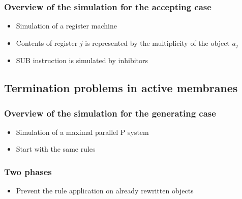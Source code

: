     \begin{frame}[t]\frametitle{Overview of the simulation for the accepting case}
      \begin{itemize}
        \item Simulation of a register machine
        \item Contents of register $j$ is represented by the multiplicity of the object $a_j$
        \item SUB instruction is simulated by inhibitors
      \end{itemize}
    \end{frame}
    \note{}


  \subsection{Termination problems in active membranes} %
  \label{sub:termination_problems_in_active_membranes}

    \begin{frame}[t]\frametitle{Overview of the simulation for the generating case}
      \begin{itemize}
        \item Simulation of a maximal parallel P system
        \item Start with the same rules
      \end{itemize}
      \simulationpicture
    \end{frame}
    \note{}

    \begin{frame}[t]\frametitle{Two phases}
      \begin{itemize}
        \item Prevent the rule application on already rewritten objects
      \end{itemize}
    \end{frame}
    \note{}

